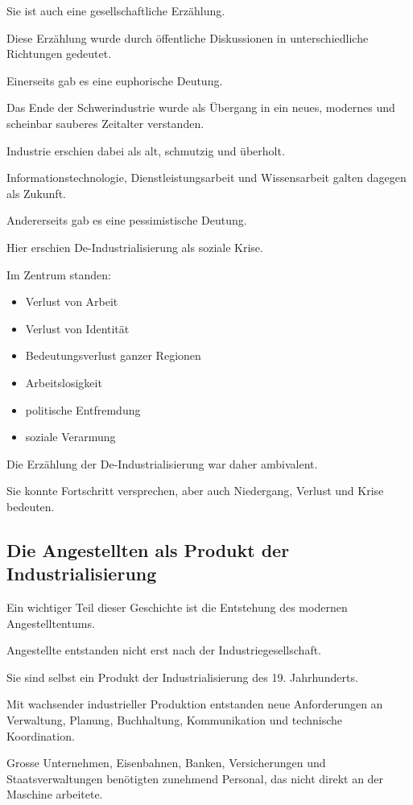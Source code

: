 Sie ist auch eine gesellschaftliche Erzählung.

Diese Erzählung wurde durch öffentliche Diskussionen
in unterschiedliche Richtungen gedeutet.

Einerseits gab es eine euphorische Deutung.

Das Ende der Schwerindustrie
wurde als Übergang
in ein neues,
modernes
und scheinbar sauberes Zeitalter verstanden.

Industrie erschien dabei als alt,
schmutzig
und überholt.

Informationstechnologie,
Dienstleistungsarbeit
und Wissensarbeit galten dagegen
als Zukunft.

Andererseits gab es eine pessimistische Deutung.

Hier erschien De-Industrialisierung
als soziale Krise.

Im Zentrum standen:

\begin{itemize}
\item Verlust von Arbeit
\item Verlust von Identität
\item Bedeutungsverlust ganzer Regionen
\item Arbeitslosigkeit
\item politische Entfremdung
\item soziale Verarmung
\end{itemize}

Die Erzählung der De-Industrialisierung
war daher ambivalent.

Sie konnte Fortschritt versprechen,
aber auch Niedergang,
Verlust
und Krise bedeuten.

\subsection{Die Angestellten als Produkt der Industrialisierung}

Ein wichtiger Teil dieser Geschichte
ist die Entstehung des modernen Angestelltentums.

Angestellte entstanden nicht erst
nach der Industriegesellschaft.

Sie sind selbst ein Produkt
der Industrialisierung des 19. Jahrhunderts.

Mit wachsender industrieller Produktion
entstanden neue Anforderungen
an Verwaltung,
Planung,
Buchhaltung,
Kommunikation
und technische Koordination.

Grosse Unternehmen,
Eisenbahnen,
Banken,
Versicherungen
und Staatsverwaltungen
benötigten zunehmend Personal,
das nicht direkt an der Maschine arbeitete.

